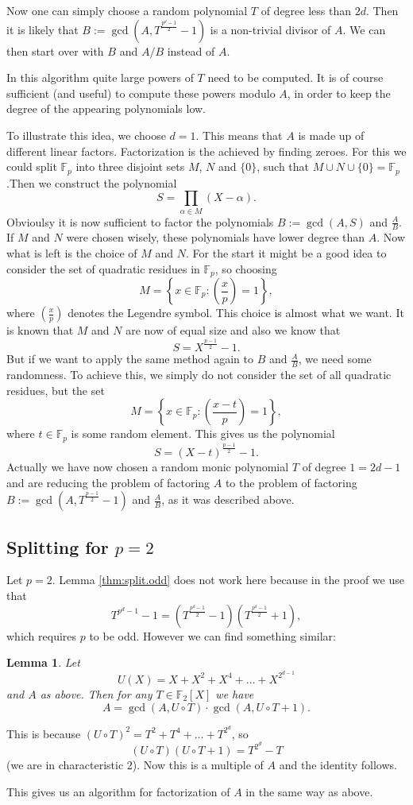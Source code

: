 \documentclass[12pt]{article}
\newtheorem{theorem}{Lemma}
\begin{document}
Now one can simply choose a random polynomial $T$ of degree less than $2d$. Then it is likely that $B:=\gcd(A,T^\frac{p^d-1}{2}-1)$ is a non-trivial divisor of $A$. We can then start over with $B$ and $A/B$ instead of $A$.

In this algorithm quite large powers of $T$ need to be computed. It is of course sufficient (and useful) to compute these powers modulo $A$, in order to keep the degree of the appearing polynomials low.

To illustrate this idea, we choose $d=1$. This means that $A$ is made up of different linear factors. Factorization is the achieved by finding zeroes. For this we could split $\mathbb{F}_p$ into three disjoint sets $M$, $N$ and $\{0\}$, such that $M\cup N\cup \{0\}=\mathbb{F}_p$.Then we construct the polynomial 
$$S=\prod_{\alpha\in M}(X-\alpha).$$
Obvioulsy it is now sufficient to factor the polynomials $B:=\gcd(A,S)$ and $\frac{A}{B}$. If $M$ and $N$ were chosen wisely, these polynomials have lower degree than $A$. Now what is left is the choice of $M$ and $N$. For the start it might be a good idea to consider the set of quadratic residues in $\mathbb{F}_p$, so choosing
$$M=\left\{x\in\mathbb{F}_p:\left(\frac{x}{p}\right)=1\right\},$$
where $\left(\frac{x}{p}\right)$ denotes the Legendre symbol. This choice is almost what we want. It is known that $M$ and $N$ are now of equal size and also we know that 
$$S=X^\frac{p-1}{2}-1.$$
But if we want to apply the same method again to $B$ and $\frac{A}{B}$, we need some randomness. To achieve this, we simply do not consider the set of all quadratic residues, but the set
$$M=\left\{x\in\mathbb{F}_p:\left(\frac{x-t}{p}\right)=1\right\},$$
where $t\in\mathbb{F}_p$ is some random element. This gives us the polynomial
$$S=(X-t)^\frac{p-1}{2}-1.$$
Actually we have now chosen a random monic polynomial $T$ of degree $1=2d-1$ and are reducing the problem of factoring $A$ to the problem of factoring $B:=\gcd(A,T^\frac{p-1}{2}-1)$ and $\frac{A}{B}$, as it was described above.

\subsection{Splitting for $p=2$}
Let $p=2$. Lemma \ref{thm:split.odd} does not work here because in the proof we use that
$$T^{p^d-1}-1=\left(T^\frac{p^d-1}{2}-1\right)\left(T^\frac{p^d-1}{2}+1\right),$$
which requires $p$ to be odd. However we can find something similar:
\begin{theorem}\label{thm:split.even}
Let
$$U(X)=X+X^2+X^4+\dots+X^{2^{d-1}}$$
and $A$ as above. Then for any $T\in\mathbb{F}_2[X]$ we have
$$A=\gcd(A,U\circ T)\cdot\gcd(A,U\circ T+1).$$
\end{theorem}
This is because $(U\circ T)^2=T^2+T^4+\dots+T^{2^d}$, so
$$(U\circ T)(U\circ T+1)=T^{2^d}-T$$
(we are in characteristic 2). Now this is a multiple of $A$ and the identity follows.

This gives us an algorithm for factorization of $A$ in the same way as above.
\end{document}
